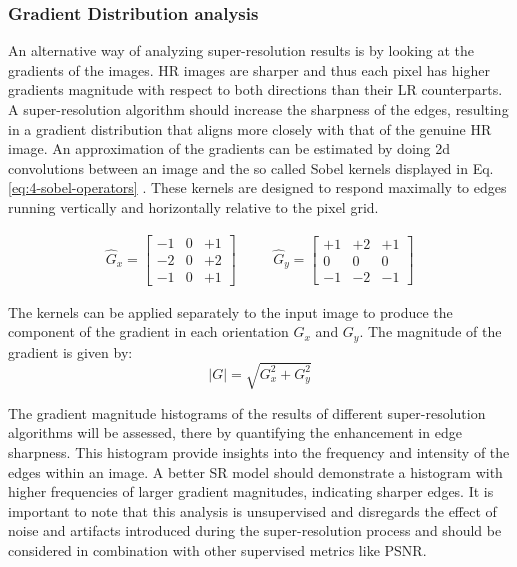         \subsubsection{Gradient Distribution analysis}


        An alternative way of analyzing super-resolution results is by looking at the gradients of the images. HR images are sharper and thus each pixel has higher gradients magnitude with respect to both directions than their LR counterparts. A super-resolution algorithm should increase the sharpness of the edges, resulting in a gradient distribution that aligns more closely with that of the genuine HR image. An approximation of the gradients can be estimated by doing 2d convolutions between an image and the so called Sobel kernels displayed in Eq. \ref{eq:4-sobel-operators} \cite{Sobel1990AnI3}. These kernels are designed to respond maximally to edges running vertically and horizontally relative to the pixel grid.
        
        \begin{equation}
            \begin{array}{ccc}
            \hat{G}_x = \begin{bmatrix}
            -1 & 0 & +1 \\
            -2 & 0 & +2 \\
            -1 & 0 & +1
            \end{bmatrix}
            &
            \quad
            &
            \hat{G}_y = \begin{bmatrix}
            +1 & +2 & +1 \\
             0 &  0 &  0 \\
            -1 & -2 & -1
            \end{bmatrix}
            \end{array}
            \label{eq:4-sobel-operators}
        \end{equation}
    
         The kernels can be applied separately to the input image to produce the component of the gradient in each orientation $G_x$ and $G_y$. The magnitude of the gradient  is given by: 
         \begin{equation}
             |G| = \sqrt{G_x^2 + G_y^2}
             \label{eq:4-gradient_magnitude}
         \end{equation}

         The gradient magnitude histograms of the results of different super-resolution algorithms will be assessed, there by quantifying the enhancement in edge sharpness.  This histogram provide insights into the frequency and intensity of the edges within an image. A better SR model should demonstrate a histogram with higher frequencies of larger gradient magnitudes, indicating sharper edges. It is important to note that this analysis is unsupervised and disregards the effect of noise and artifacts introduced during the super-resolution process and should be considered in combination with other supervised metrics like PSNR.

